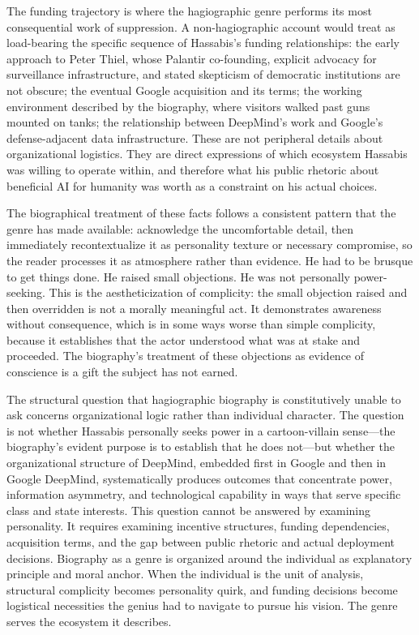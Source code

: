 \documentclass[12pt, a4paper]{article}
\begin{document}
The funding trajectory is where the hagiographic genre performs its most consequential work of
suppression. A non-hagiographic account would treat as load-bearing the specific sequence of
Hassabis's funding relationships: the early approach to Peter Thiel, whose Palantir co-founding,
explicit advocacy for surveillance infrastructure, and stated skepticism of democratic institutions
are not obscure; the eventual Google acquisition and its terms; the working environment described
by the biography, where visitors walked past guns mounted on tanks; the relationship between
DeepMind's work and Google's defense-adjacent data infrastructure. These are not peripheral details
about organizational logistics. They are direct expressions of which ecosystem Hassabis was willing
to operate within, and therefore what his public rhetoric about beneficial AI for humanity was
worth as a constraint on his actual choices.

The biographical treatment of these facts follows a consistent pattern that the genre has made
available: acknowledge the uncomfortable detail, then immediately recontextualize it as personality
texture or necessary compromise, so the reader processes it as atmosphere rather than evidence. He
had to be brusque to get things done. He raised small objections. He was not personally
power-seeking. This is the aestheticization of complicity: the small objection raised and then
overridden is not a morally meaningful act. It demonstrates awareness without consequence, which is
in some ways worse than simple complicity, because it establishes that the actor understood what
was at stake and proceeded. The biography's treatment of these objections as evidence of conscience
is a gift the subject has not earned.

The structural question that hagiographic biography is constitutively unable to ask concerns
organizational logic rather than individual character. The question is not whether Hassabis
personally seeks power in a cartoon-villain sense---the biography's evident purpose is to establish
that he does not---but whether the organizational structure of DeepMind, embedded first in Google
and then in Google DeepMind, systematically produces outcomes that concentrate power, information
asymmetry, and technological capability in ways that serve specific class and state interests. This
question cannot be answered by examining personality. It requires examining incentive structures,
funding dependencies, acquisition terms, and the gap between public rhetoric and actual deployment
decisions. Biography as a genre is organized around the individual as explanatory principle and
moral anchor. When the individual is the unit of analysis, structural complicity becomes
personality quirk, and funding decisions become logistical necessities the genius had to navigate
to pursue his vision. The genre serves the ecosystem it describes.
\end{document}
